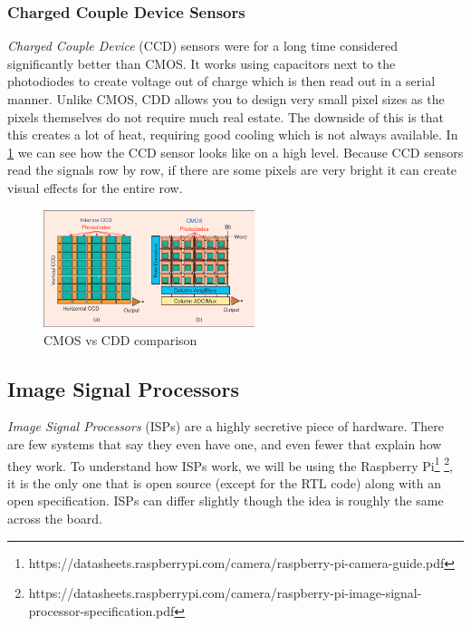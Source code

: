 \subsubsection{Charged Couple Device Sensors}
\textit{Charged Couple Device} (CCD) sensors were for a long time considered
significantly better than CMOS. It works using capacitors next to the
photodiodes to create voltage out of charge which is then read out in a serial
manner. Unlike CMOS, CDD allows you to design very small pixel sizes as the
pixels themselves do not require much real estate. The downside of this is that
this creates a lot of heat, requiring good cooling which is not always
available. In \cref{fig:cmosvsccd} we can see how the CCD sensor looks like on
a high level. Because CCD sensors read the signals row by row, if there are some
pixels are very bright it can create visual effects for the entire row.

\begin{figure}
    \begin{center}
        \includegraphics[width=0.55\textwidth]{figures/cmos_vs_cdd}
    \end{center}
    \caption{CMOS vs CDD comparison\cite{ieeeCMOS}}\label{fig:cmosvsccd}
\end{figure}


\newpage
\subsection{Image Signal Processors} \label{section:isp}
\textit{Image Signal Processors} (ISPs) are a highly secretive piece of
hardware. There are few systems that say they even have one, and even fewer
that explain how they work. To understand how ISPs work, we will be using the
Raspberry Pi\footnote[2]{https://datasheets.raspberrypi.com/camera/raspberry-pi-camera-guide.pdf}
\footnote{https://datasheets.raspberrypi.com/camera/raspberry-pi-image-signal-processor-specification.pdf},
it is the only one that is open source (except for the RTL code) along with an
open specification. ISPs can differ slightly though the idea is roughly the
same across the board.

